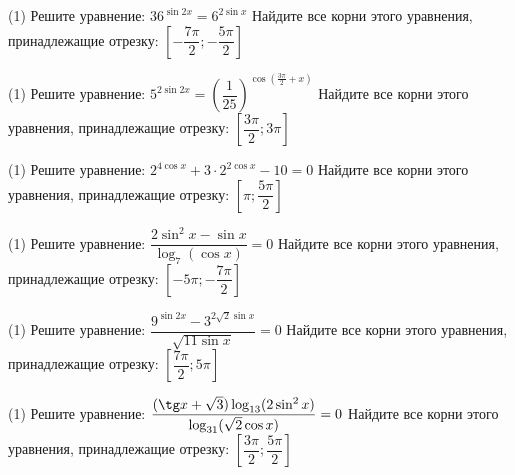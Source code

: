 \begin{class}[number=2]
	\begin{listofex}
		\item %
		\begin{tasks}(1)
			\task Решите уравнение: \( 36^{\sin 2x} = 6^{2\sin x} \)
			\task Найдите все корни этого уравнения, принадлежащие отрезку: \( \left[ -\dfrac{7\pi}{2}; - \dfrac{5\pi}{2} \right]  \)
		\end{tasks}
		\item %
		\begin{tasks}(1)
			\task Решите уравнение: \( 5^{2\sin2x}= \left( \dfrac{1}{25} \right)^{\cos{(\frac{3\pi}{2}+x)}}  \)
			\task Найдите все корни этого уравнения, принадлежащие отрезку: \( \left[ \dfrac{3\pi}{2}; 3\pi \right] \)
		\end{tasks}
		\item %
		\begin{tasks}(1)
			\task Решите уравнение: \( 2^{4\cos x} + 3 \cdot 2^{2\cos x} -10 = 0 \)
			\task Найдите все корни этого уравнения, принадлежащие отрезку: \( \left[ \pi; \dfrac{5\pi}{2} \right] \)
		\end{tasks}
		\item %
		\begin{tasks}(1)
			\task Решите уравнение: \( \dfrac{2\sin^2{x} - \sin x}{\log_7 (\cos x)} = 0 \)
			\task Найдите все корни этого уравнения, принадлежащие отрезку: \( \left[ -5\pi; -\dfrac{7\pi}{2} \right] \)
		\end{tasks}
		\item %
		\begin{tasks}(1)
			\task Решите уравнение: \( \dfrac{9^{\sin 2x} - 3^{2\sqrt{2} \sin x}}{\sqrt{11 \sin x}} = 0 \)
			\task Найдите все корни этого уравнения, принадлежащие отрезку: \( \left[ \dfrac{7\pi}{2}; 5\pi \right] \)
		\end{tasks}
		\item %
		\begin{tasks}(1)
			\task Решите уравнение: \( \dfrac{(\tg x + \sqrt{3}) \log_{13} (2\sin^2{x}) }{\log_{31} (\sqrt{2}\cos x)}=0 \)
			\task Найдите все корни этого уравнения, принадлежащие отрезку: \( \left[ \dfrac{3\pi}{2}; \dfrac{5\pi}{2} \right] \)
		\end{tasks}
	\end{listofex}
\end{class}

